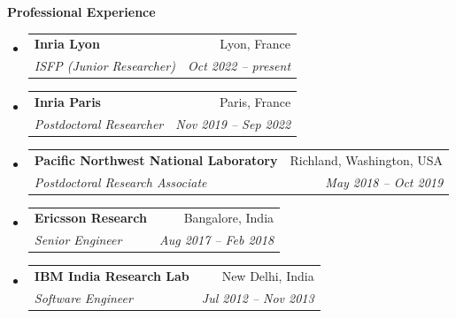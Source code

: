 \documentclass[letterpaper,11pt]{article}
\makeatletter
\newcommand{\resheading}[1]{{\large \colorbox{mygrey}{\begin{minipage}{\textwidth}{\textbf{#1 \vphantom{p\^{E}}}}\end{minipage}}}}
\newcommand{\ressubheading}[4]{
\begin{tabular*}{6.5in}{l@{\extracolsep{\fill}}r}
		\textbf{#1} & #2 \\
		\textit{#3} & \textit{#4} \\
\end{tabular*}\vspace{-6pt}}
\makeatother
\begin{document}
\vspace{0.1in} 
\resheading{Professional Experience}
\begin{itemize}
	\item \ressubheading{{Inria Lyon}}{Lyon, France}{{ISFP (Junior Researcher)}}{Oct 2022 -- present} \newline
	\item \ressubheading{{Inria Paris}}{Paris, France}{{Postdoctoral Researcher}}{Nov 2019 -- Sep 2022} \newline
	
	\item \ressubheading{{Pacific Northwest National Laboratory}}{Richland, Washington, USA}{{Postdoctoral Research Associate}}{May 2018 -- Oct 2019} \newline
	
	\item \ressubheading{{Ericsson Research}}{Bangalore, India}{{Senior Engineer}}{Aug 2017 -- Feb 2018} \newline
	
	\item \ressubheading{{IBM India Research Lab}}{New Delhi, India}{{Software Engineer}}{Jul 2012 -- Nov 2013} \newline
	

	
\end{itemize}
\end{document}
